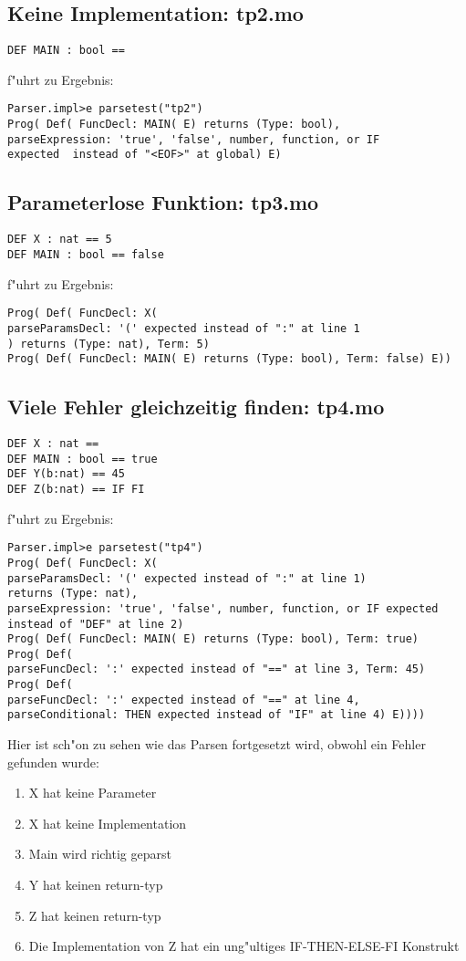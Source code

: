 \documentclass[a4paper,12pt]{report}
\begin{document}
\subsection{Keine Implementation: tp2.mo}
\begin{verbatim}
DEF MAIN : bool ==
\end{verbatim}
f"uhrt zu Ergebnis:
\begin{verbatim}
Parser.impl>e parsetest("tp2")
Prog( Def( FuncDecl: MAIN( E) returns (Type: bool), 
parseExpression: 'true', 'false', number, function, or IF
expected  instead of "<EOF>" at global) E)
\end{verbatim}

\subsection{Parameterlose Funktion: tp3.mo}
\begin{verbatim}
DEF X : nat == 5
DEF MAIN : bool == false
\end{verbatim}
f"uhrt zu Ergebnis:
\begin{verbatim}
Prog( Def( FuncDecl: X( 
parseParamsDecl: '(' expected instead of ":" at line 1
) returns (Type: nat), Term: 5)
Prog( Def( FuncDecl: MAIN( E) returns (Type: bool), Term: false) E))
\end{verbatim}


\subsection{Viele Fehler gleichzeitig finden: tp4.mo}
\begin{verbatim}
DEF X : nat ==
DEF MAIN : bool == true
DEF Y(b:nat) == 45
DEF Z(b:nat) == IF FI
\end{verbatim}
f"uhrt zu Ergebnis:
\begin{verbatim}
Parser.impl>e parsetest("tp4")
Prog( Def( FuncDecl: X( 
parseParamsDecl: '(' expected instead of ":" at line 1) 
returns (Type: nat), 
parseExpression: 'true', 'false', number, function, or IF expected 
instead of "DEF" at line 2)
Prog( Def( FuncDecl: MAIN( E) returns (Type: bool), Term: true)
Prog( Def( 
parseFuncDecl: ':' expected instead of "==" at line 3, Term: 45)
Prog( Def( 
parseFuncDecl: ':' expected instead of "==" at line 4, 
parseConditional: THEN expected instead of "IF" at line 4) E))))
\end{verbatim}
Hier ist sch"on zu sehen wie das Parsen fortgesetzt wird, obwohl ein Fehler gefunden wurde:
\begin{enumerate}
\item X hat keine Parameter
\item X hat keine Implementation
\item Main wird richtig geparst
\item Y hat keinen return-typ
\item Z hat keinen return-typ
\item Die Implementation von Z hat ein ung"ultiges IF-THEN-ELSE-FI Konstrukt
\end{enumerate}
\end{document}
